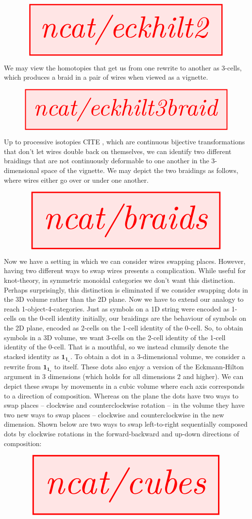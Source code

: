 \[\resizebox{\textwidth}{!}{\tikzfig{ncat/eckhilt2}}\]

We may view the homotopies that get us from one rewrite to another as 3-cells, which produces a braid in a pair of wires when viewed as a vignette.

\[\resizebox{\textwidth}{!}{\tikzfig{ncat/eckhilt3braid}}\]

Up to processive isotopies \bR CITE \e, which are continuous bijective transformations that don't let wires double back on themselves, we can identify two different braidings that are not continuously deformable to one another in the 3-dimensional space of the vignette. We may depict the two braidings as follows, where wires either go over or under one another.

\[\resizebox{\textwidth}{!}{\tikzfig{ncat/braids}}\]

Now we have a setting in which we can consider wires swapping places. However, having two different ways to swap wires presents a complication. While useful for knot-theory, in symmetric monoidal categories we don't want this distinction. Perhaps surprisingly, this distinction is eliminated if we consider swapping dots in the 3D volume rather than the 2D plane. Now we have to extend our analogy to reach 1-object-4-categories. Just as symbols on a 1D string were encoded as 1-cells on the 0-cell identity initially, our braidings are the behaviour of symbols on the 2D plane, encoded as 2-cells on the 1-cell identity of the 0-cell. So, to obtain symbols in a 3D volume, we want 3-cells on the 2-cell identity of the 1-cell identity of the 0-cell. That is a mouthful, so we instead clumsily denote the stacked identity as $\textbf{1}_{\textbf{1}_\star}$. To obtain a dot in a 3-dimensional volume, we consider a rewrite from $\textbf{1}_{\textbf{1}_\star}$ to itself. These dots also enjoy a version of the Eckmann-Hilton argument in 3 dimensions (which holds for all dimensions 2 and higher). We can depict these swaps by movements in a cubic volume where each axis corresponds to a direction of composition. Whereas on the plane the dots have two ways to swap places -- clockwise and counterclockwise rotation -- in the volume they have two new ways to swap places -- clockwise and counterclockwise in the new dimension. Shown below are two ways to swap left-to-right sequentially composed dots by clockwise rotations in the forward-backward and up-down directions of composition:

\[\resizebox{\textwidth}{!}{\tikzfig{ncat/cubes}}\]

